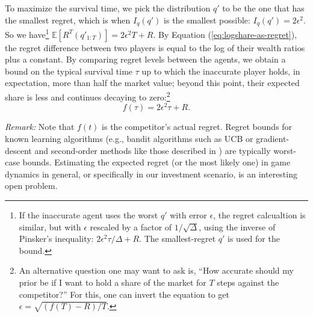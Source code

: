 To maximize the survival time, we pick the distribution $q'$ to be the one that has the smallest regret, which is when $I_q(q')$ is the smallest possible: $I_q(q') = 2\epsilon^2$. So we have\footnote{If the inaccurate agent uses the worst $q'$ with error $\epsilon$, the regret calcualtion is similar, but with $\epsilon$ rescaled by a factor of $1/\sqrt{\Delta}$, using the inverse of Pinsker's inequality: 
$2 \epsilon^2 \tau/\Delta  + R$. The smallest-regret  $q'$ is used for the bound.} 
$\mathbb{E}[R^{T}(q'_{1:T})] = 2\epsilon^2 T + R$. 
% 
By Equation (\ref{eq:logshare-as-regret}), the regret difference between two players is equal to the log of their wealth ratios  plus a constant. By comparing regret levels between the agents, we obtain a bound on the typical survival time $\tau$ up to which the inaccurate player holds, in expectation, more than half the market value; beyond this point, their expected share is less and continues decaying to zero:\footnote{An alternative question one may want to ask is, ``How accurate should my prior be if I want to hold a share of the market for $T$ steps against the competitor?'' For this, one can invert the equation to get $\epsilon = \sqrt{(f(T) - R)/T}$.}
\[
f(\tau) = 2\epsilon^2 \tau + R.
\]

\vspace{5pt}
\noindent
{\em Remark:} Note that $f(t)$ is the competitor's actual regret. Regret bounds for known learning algorithms (e.g., bandit algorithms such as UCB \cite{slivkins2019introduction} or gradient-descent and second-order methods like those described in  \cite{hazan2016introduction}) are typically worst-case bounds. Estimating the expected regret (or the most likely one) in game dynamics in general, or specifically in our investment scenario, is an interesting open problem.
\vspace{5pt}

